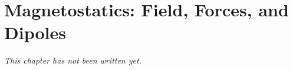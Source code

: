 \chapter{Magnetostatics: Field, Forces, and Dipoles}\label{ch:b1:magnetostatics}


\emph{This chapter has not been written yet.}
